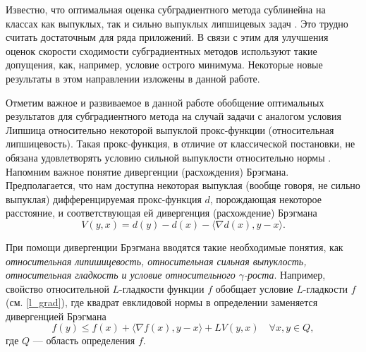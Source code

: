Известно, что оптимальная оценка субградиентного метода сублинейна на классах как выпуклых, так и сильно выпуклых липшицевых задач \cite{Bach_2012}. Это трудно считать достаточным для ряда приложений. В связи с этим для улучшения оценок скорости сходимости субградиентных методов используют такие допущения, как, например, условие острого минимума. Некоторые новые результаты в этом направлении изложены в данной работе.
\iffalse
    Подобные условия позволяют сделать несколько начальных эффективных шагов, что было продемонстрировано в работе \cite{sharp22} и будет затронуто во второй главе данной работы. Также в упомянутой главе было проведено сравнение оценок скорости субградиентных для классов задач с острым минимумом и сильной выпуклостью. Острый минимум может приводить к лучшей оценке скорости сходимости, однако данное свойство требует информации о точном решении, что является существенным ограничением.

    Оценки, получаемые при помощи условия острого минимума, обладают лучшими свойствами сходимости, однако в отсутствии знаний о точном решении нет возможности повысить точность выше предварительно заданной точности, известной для приближенного решения. Оценки скорости сходимости, использующие сильную выпуклость, не обладают столь впечатляющими оценками скорости сходимости, однако позволяют добиться гораздо большей точности. 
\fi

Отметим важное и развиваемое в данной работе обобщение оптимальных результатов для субградиентного метода на случай задачи с аналогом условия Липшица относительно некоторой выпуклой прокс-функции (относительная липшицевость). Такая прокс-функция, в отличие от классической постановки, не обязана удовлетворять условию сильной выпуклости относительно нормы \cite{AdaMirr_2021,Lu_2018,Zhou_NIPS_2020}. Напомним важное понятие дивергенции (расхождения) Брэгмана. Предполагается, что нам доступна некоторая выпуклая (вообще говоря, не сильно выпуклая) дифференцируемая прокс-функция $d$, порождающая некоторое расстояние, и соответствующая ей дивергенция (расхождение) Брэгмана \cite{Bauschke}
\[
    V(y, x) = d(y) - d(x) - \langle \nabla d(x), y - x \rangle.
\]

При помощи дивергенции Брэгмана вводятся такие необходимые понятия, как \textit{относительная липишицевость, относительная сильная выпуклость, относительная гладкость и условие относительного $\gamma$-роста}. Например, свойство относительной $L$-гладкости функции $f$ обобщает условие $L$-гладкости $f$ (см. \eqref{l_grad}), где квадрат евклидовой нормы в определении заменяется дивергенцией Брэгмана
$$
    f(y) \leq f(x) + \langle \nabla{f(x)}, y - x \rangle  + L V(y,x) \quad   \forall x, y \in Q,
$$
где $Q$ --- область определения $f$.

